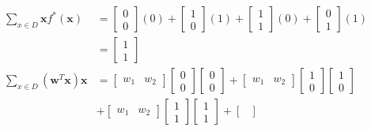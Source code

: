 \begin{align}
  \sum_{x\in D}\textbf{x}f^{*}(\textbf{x}) &= \begin{bmatrix}
    0 \\
    0
  \end{bmatrix}(0) + \begin{bmatrix}
    1 \\
    0
  \end{bmatrix}(1) + \begin{bmatrix}
    1 \\
    1
  \end{bmatrix}(0)+ \begin{bmatrix}
    0 \\
    1
  \end{bmatrix}(1) \nonumber \\
  &= \begin{bmatrix}
    1 \\
    1
  \end{bmatrix}\\
  \nonumber
  \sum_{x\in D}(\textbf{w}^T\textbf{x})\textbf{x} &= \begin{bmatrix}
    w_1 & w_2
  \end{bmatrix} \begin{bmatrix}
    0 \\
    0
  \end{bmatrix} \begin{bmatrix}
    0 \\
    0
  \end{bmatrix} + \begin{bmatrix}
    w_1 & w_2
  \end{bmatrix} \begin{bmatrix}
    1 \\
    0
  \end{bmatrix} \begin{bmatrix}
    1 \\
    0
  \end{bmatrix} \\ \nonumber
  &+ \begin{bmatrix}
    w_1 & w_2
  \end{bmatrix} \begin{bmatrix}
    1 \\
    1
  \end{bmatrix} \begin{bmatrix}
    1 \\
    1
  \end{bmatrix} + \begin{bmatrix}

\end{bmatrix}
\end{align}
